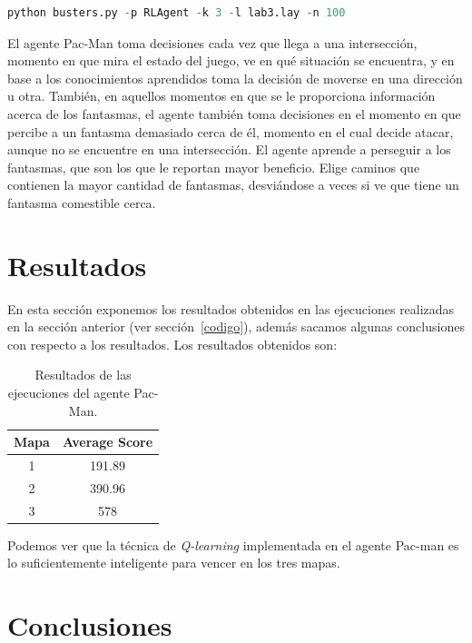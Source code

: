 \documentclass[11pt]{exam}
\begin{document}
\begin{lstlisting}[language=python, basicstyle=\footnotesize]
python busters.py -p RLAgent -k 3 -l lab3.lay -n 100
\end{lstlisting}

El agente Pac-Man toma decisiones cada vez que llega a una intersección, momento en que mira el estado del juego, ve en qué situación se encuentra, y en base a los conocimientos aprendidos toma la decisión de moverse en una dirección u otra. También, en aquellos momentos en que se le proporciona información acerca de los fantasmas, el agente también toma decisiones en el momento en que percibe a un fantasma demasiado cerca de él, momento en el cual decide atacar, aunque no se encuentre en una intersección. El agente aprende a perseguir a los fantasmas, que son los que le reportan mayor beneficio. Elige caminos que contienen la mayor cantidad de fantasmas, desviándose a veces si ve que tiene un fantasma comestible cerca.

\section{Resultados}\label{resultados}

En esta sección exponemos los resultados obtenidos en las ejecuciones realizadas en la sección anterior (ver sección~\ref{codigo}), además sacamos algunas conclusiones con respecto a los resultados. Los resultados obtenidos son:

\begin{table}[H]
	\centering
	\begin{tabular}{|c|c|} 
		\hline
		Mapa & Average Score \\ 
		\hline
		1 & 191.89 \\ 
		2 & 390.96 \\
		3 & 578 \\
		\hline
	\end{tabular}
	\caption{Resultados de las ejecuciones del agente Pac-Man.}
	\label{resultados_ejecuciones}
\end{table}

Podemos ver que la técnica de \textit{Q-learning} implementada en el agente Pac-man es lo suficientemente inteligente para vencer en los tres mapas.
 
\section{Conclusiones}\label{conclusiones}
\end{document}
